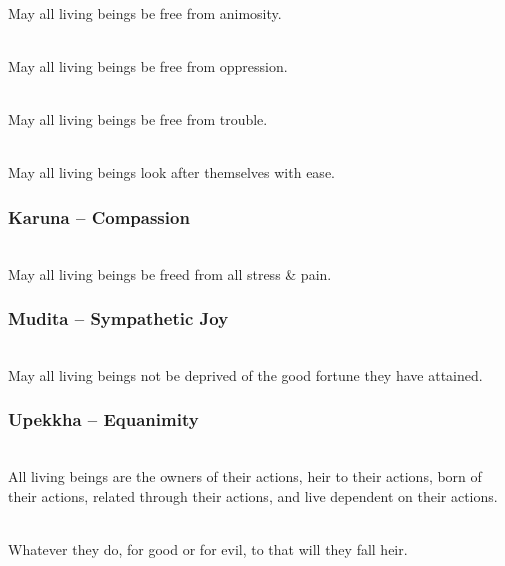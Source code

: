 \documentclass[letterpaper,10pt,english]{sphinxmanual}
\begin{document}
\sphinxAtStartPar
{} \\
May all living beings be free from animosity.

\sphinxAtStartPar
{} \\
May all living beings be free from oppression.

\sphinxAtStartPar
{} \\
May all living beings be free from trouble.

\sphinxAtStartPar
{} \\
May all living beings look after themselves with ease.


\subsubsection{Karuna – Compassion}
\label{\detokenize{chanting:karuna-compassion}}
\sphinxAtStartPar
{} \\
May all living beings be freed from all stress \& pain.


\subsubsection{Mudita – Sympathetic Joy}
\label{\detokenize{chanting:mudita-sympathetic-joy}}
\sphinxAtStartPar
{} \\
May all living beings not be deprived of the good fortune they have attained.


\subsubsection{Upekkha – Equanimity}
\label{\detokenize{chanting:upekkha-equanimity}}
\sphinxAtStartPar
{} \\
All living beings are the owners of their actions, heir to their actions, born of their actions, related through their actions, and live dependent on their actions.

\sphinxAtStartPar
{} \\
Whatever they do, for good or for evil, to that will they fall heir.
\end{document}

